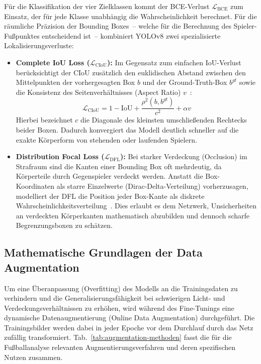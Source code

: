 Für die Klassifikation der vier Zielklassen kommt der \ac{BCE}-Verlust $\mathcal{L}_{\text{BCE}}$ zum Einsatz, 
der für jede Klasse unabhängig die Wahrscheinlichkeit berechnet. Für die räumliche Präzision der Bounding 
Boxes~-- welche für die Berechnung des Spieler-Fußpunktes entscheidend ist~-- kombiniert YOLOv8 zwei 
spezialisierte Lokalisierungsverluste:
\begin{itemize}
    \item \textbf{Complete IoU Loss ($\mathcal{L}_{\text{CIoU}}$):} Im Gegensatz zum einfachen \ac{IoU}-Verlust berücksichtigt der \ac{CIoU} zusätzlich den euklidischen Abstand zwischen den Mittelpunkten der vorhergesagten Box $b$ und der Ground-Truth-Box $b^{gt}$ sowie die Konsistenz des Seitenverhältnisses (Aspect Ratio) $v$~\cite{zheng2020distance}:
    \begin{equation}
        \mathcal{L}_{\text{CIoU}} = 1 - \text{IoU} + \frac{\rho^2(b, b^{gt})}{c^2} + \alpha v
    \end{equation}
    Hierbei bezeichnet $c$ die Diagonale des kleinsten umschließenden Rechtecks beider Boxen. Dadurch konvergiert das Modell deutlich schneller auf die exakte Körperform von stehenden oder laufenden Spielern.
    \item \textbf{Distribution Focal Loss ($\mathcal{L}_{\text{DFL}}$):} Bei starker Verdeckung (Occlusion) im Strafraum sind die Kanten einer Bounding Box oft mehrdeutig, da Körperteile durch Gegenspieler verdeckt werden. Anstatt die Box-Koordinaten als starre Einzelwerte (Dirac-Delta-Verteilung) vorherzusagen, modelliert der \ac{DFL} die Position jeder Box-Kante als diskrete Wahrscheinlichkeitsverteilung~\cite{li2020generalized}. Dies erlaubt es dem Netzwerk, Unsicherheiten an verdeckten Körperkanten mathematisch abzubilden und dennoch scharfe Begrenzungsboxen zu schätzen.
\end{itemize}

\subsection{Mathematische Grundlagen der Data Augmentation}

Um eine Überanpassung (Overfitting) des Modells an die Trainingsdaten zu verhindern und die 
Generalisierungsfähigkeit bei schwierigen Licht- und Verdeckungsverhältnissen zu erhöhen, wird 
während des Fine-Tunings eine dynamische Datenaugmentierung (Online Data Augmentation) durchgeführt. 
Die Trainingsbilder werden dabei in jeder Epoche vor dem Durchlauf durch das Netz zufällig transformiert. 
Tab.~\ref{tab:augmentation-methoden} fasst die für die Fußballanalyse relevanten Augmentierungsverfahren 
und deren spezifischen Nutzen zusammen.

